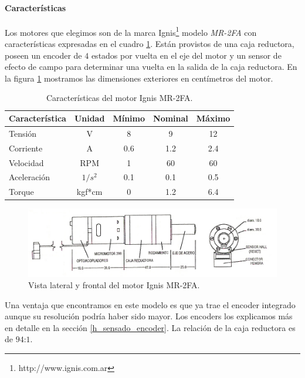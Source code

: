 \paragraph{Caracter\'isticas}
\label{h_actuadores_motorDC_caracteristicas}

Los motores que elegimos son de la marca Ignis\footnote{http://www.ignis.com.ar} modelo \emph{MR-2FA}
con caracter\'isticas expresadas en el cuadro \ref{hT_motorDC}.
Est\'an provistos de una caja reductora, poseen un encoder de $4$ estados por vuelta en el eje del
motor y un sensor de efecto de campo para determinar una vuelta en la salida de la caja reductora.
En la figura \ref{hF_motorDC} mostramos las dimensiones exteriores en cent\'imetros del motor.

\begin{table}
	\begin{center}
		\begin{tabular}{|l|c|c|c|c|}
			\hline
			Caracter\'istica & Unidad & M\'inimo & Nominal & M\'aximo \\
			\hline
			Tensi\'on & V & 8 & 9 & 12 \\
			Corriente & A & 0.6 & 1.2 & 2.4 \\
			Velocidad & RPM & 1 & 60 & 60 \\
			Aceleraci\'on & $1/s^{2}$ & 0.1 & 0.1 & 0.5 \\
			Torque & kgf*cm & 0 & 1.2 & 6.4 \\
			\hline
		\end{tabular}
	\end{center}
	\caption{Caracter\'isticas del motor Ignis MR-2FA.}
	\label{hT_motorDC}
\end{table}

\begin{figure}[h]
	\centering
	\includegraphics[scale=1]{figuras/MR2-FA.png}
	\caption{Vista lateral y frontal del motor Ignis MR-2FA.}
	\label{hF_motorDC}
\end{figure}

Una ventaja que encontramos en este modelo es que ya trae el encoder integrado aunque su resoluci\'on podr\'ia haber sido mayor.
Los encoders los explicamos m\'as en detalle en la secci\'on \ref{h_sensado_encoder}.
La relaci\'on de la caja reductora es de $94$:$1$.

